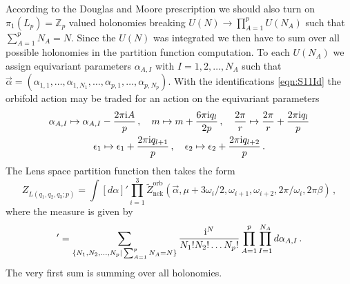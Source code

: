 \documentclass[main.tex]{subfiles}
\begin{document}
According to the Douglas and Moore prescription \cite{Douglas:1996sw} we should also turn on $\pi_1\left(L_p\right)=\mathbb{Z}_p$ valued holonomies breaking $U(N)\to \prod_{A=1}^pU\left(N_A\right)$ such that $\sum_{A=1}^pN_A=N$. 
Since the $U(N)$ was integrated we then have to sum over all possible holonomies in the partition function computation. 
To each $U(N_A)$ we assign equivariant parameters $\alpha_{A,I}$ with $I=1,2,\dots,N_A$ such that $\vec{\alpha}=(\alpha_{1,1},\dots,\alpha_{1,N_1},\dots,\alpha_{p,1},\dots,\alpha_{p,N_p})$. With the identifications \eqref{eqn:S11Id} the orbifold action may be traded for an action on the equivariant parameters
\begin{gather}
\alpha_{A,I}\mapsto\alpha_{A,I}-\frac{2\pi\mathrm{i} A}{p}\,,\quad m\mapsto m+\frac{6\pi\mathrm{i} q_l}{2p}\,,\quad \frac{2\pi}{r}\mapsto  \frac{2\pi}{r}+\frac{2\pi\mathrm{i} q_l}{p} \label{eqn:trans1}\\
\epsilon_1\mapsto \epsilon_1+\frac{2\pi\mathrm{i} q_{l+1}}{p}\,,\quad \epsilon_2 \mapsto \epsilon_2+\frac{2\pi\mathrm{i} q_{l+2}}{p}\label{eqn:trans2}\,.
\end{gather}
The Lens space partition function then takes the form
\begin{equation}
Z_{L(q_1,q_2,q_3;p)}=\int[d\alpha]'\prod_{i=1}^3\widetilde{Z}^{\text{orb}}_{\text{nek}}\left(\vec{\alpha},\mu+3\omega_i/2,\omega_{i+1},\omega_{i+2},2\pi/\omega_i,2\pi\beta\right)\,,
\end{equation}
where the measure is given by
\begin{equation}
[d\alpha]'=\sum_{\{N_1,N_2,\dots,N_p|\sum_{A=1}^pN_A=N\}}\frac{\iu^{N}}{N_1!N_2!\dots N_p!}\prod_{A=1}^p\prod_{I=1}^{N_A}d\alpha_{A,I}\,.
\end{equation}
The very first sum is summing over all holonomies.
\end{document}
